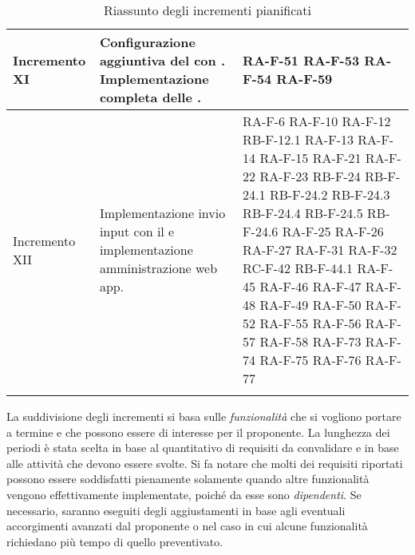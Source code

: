 \begin{center}
\begin{longtable}{|p{2.5cm}|p{6.5cm}|p{6cm}|}
	Incremento XI   & Configurazione aggiuntiva del \glock{gateway} con \glock{Kafka}. Implementazione completa delle \glock{API}. & RA-F-51 RA-F-53 RA-F-54 RA-F-59 \\ \hline
	Incremento XII	& Implementazione invio input con il \glock{bot Telegram} e implementazione amministrazione web app. & RA-F-6 RA-F-10 RA-F-12 RB-F-12.1 RA-F-13 RA-F-14 RA-F-15 RA-F-21 RA-F-22 RA-F-23 RB-F-24 RB-F-24.1 RB-F-24.2 RB-F-24.3 RB-F-24.4 RB-F-24.5 RB-F-24.6 RA-F-25 RA-F-26 RA-F-27 RA-F-31 RA-F-32 RC-F-42 RB-F-44.1 RA-F-45 RA-F-46 RA-F-47 RA-F-48 RA-F-49 RA-F-50 RA-F-52 RA-F-55 RA-F-56 RA-F-57 RA-F-58 RA-F-73 RA-F-74 RA-F-75 RA-F-76 RA-F-77 \\	\hline

	\caption{Riassunto degli incrementi pianificati}
	\end{longtable}
\end{center}
La suddivisione degli incrementi si basa sulle \textit{funzionalità} che si vogliono portare a termine e che possono essere di interesse per il proponente. La lunghezza dei periodi è stata scelta in base al quantitativo di requisiti da convalidare e in base alle attività che devono essere svolte. Si fa notare che molti dei requisiti riportati possono essere soddisfatti pienamente solamente quando altre funzionalità vengono effettivamente implementate, poiché da esse sono \textit{dipendenti}. 
\newline 
Se necessario, saranno eseguiti degli aggiustamenti in base agli eventuali accorgimenti avanzati dal proponente o nel caso in cui alcune funzionalità richiedano più tempo di quello preventivato.